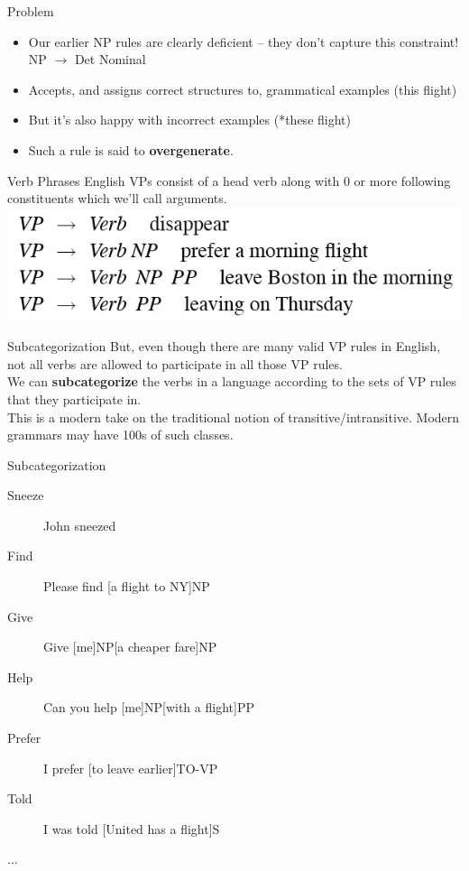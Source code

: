 \documentclass[9pt,xcolor=pdftex,dvipsnames,table]{beamer}
\begin{document}
\begin{frame}{Problem}

	\begin{itemize}
		\item Our earlier NP rules are clearly deficient -- they don't capture this constraint!\\
NP $\rightarrow$ Det Nominal\\
	\item Accepts, and assigns correct structures to, grammatical examples (this flight)
	\item But it's also happy with incorrect examples (*these flight)
	\item Such a rule is said to \textbf{overgenerate}.

	\end{itemize}
\end{frame}

\begin{frame}{Verb Phrases}
English VPs consist of a head verb along with 0 or more following constituents which we'll call arguments.
\vspace{.5cm}
\includegraphics[scale=.4]{CFG-VP}
\end{frame}

\begin{frame}{Subcategorization}
But, even though there are many valid VP rules in English, not all verbs are allowed to participate in all those VP rules.\\
We can \textbf{subcategorize} the verbs in a language according to the sets of VP rules that they participate in.\\
This is a modern take on the traditional notion of transitive/intransitive.
Modern grammars may have 100s of such classes.
\end{frame}

\begin{frame}{Subcategorization}
\begin{description}
	\item[Sneeze]  John sneezed
	\item[Find]  Please find [a flight to NY]NP
	\item[Give] Give [me]NP[a cheaper fare]NP
	\item[Help] Can you help [me]NP[with a flight]PP
	\item[Prefer] I prefer [to leave earlier]TO-VP
	\item[Told] I was told [United has a flight]S
	\item[...]
\end{description}
\end{frame}
\end{document}
